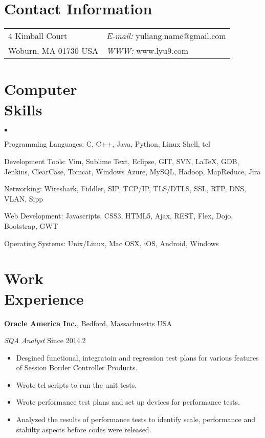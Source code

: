 \documentclass[margin,line]{res}
\newenvironment{list2}{
  \begin{list}{$\bullet$}{%
      \setlength{\itemsep}{0in}
      \setlength{\parsep}{0in} \setlength{\parskip}{0in}
      \setlength{\topsep}{0in} \setlength{\partopsep}{0in} 
      \setlength{\leftmargin}{0.2in}}}{\end{list}}
\begin{document}

\begin{resume}
\section{\sc Contact Information}
\vspace{.05in}
\begin{tabular}{@{}p{2in}p{4in}}  
4 Kimball Court & {\it E-mail:}  yuliang.name@gmail.com \\       
Woburn, MA 01730 USA  & {\it WWW:} www.lyu9.com \\     
\end{tabular}

\section{\sc Computer\\Skills} 
\begin{list2}
\item Programming Languages: C, C++, Java, Python, Linux Shell, tcl
\item Development Tools: Vim, Sublime Text, Eclipse, GIT, SVN, \LaTeX, 
                         GDB, Jenkins, ClearCase, Tomcat, Windows Azure, 
                         MySQL, Hadoop, MapReduce, Jira
\item Networking: Wireshark, Fiddler, SIP, TCP/IP, TLS/DTLS, 
                  SSL, RTP, DNS, VLAN, Sipp
\item Web Development: Javascripts, CSS3, HTML5, Ajax, 
                       REST, Flex, Dojo, Bootstrap, GWT
\item Operating Systems:  Unix/Linux, Mac OSX, iOS, Android, Windows\\
\end{list2}

\section{\sc Work\\Experience}
{\bf Oracle America Inc.}, Bedford, Massachusetts USA

\vspace{-.3cm}
{\em SQA Analyst} \hfill {Since 2014.2}\\
\begin{itemize}
\item Desgined functional, integratoin and regression test plans for various features
of Session Border Controller Products.
\item Wrote tcl scripts to run the unit tests.
\item Wrote performance test plans and set up devices for performance tests.
\item Analyzed the results of performance tests to identify scale, performance and 
stabilty aspects before codes were released.
\end{itemize}


\end{resume}
\end{document}
